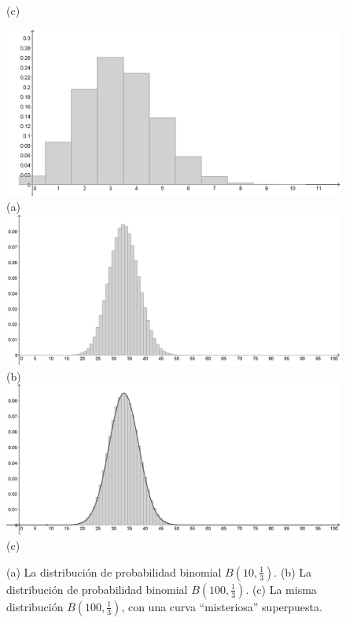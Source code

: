 \begin{figure}[p]
\begin{center}
\begin{enColor}
(c)
\end{enColor}
\begin{bn}
\includegraphics[width=12cm]{../fig/Cap05-HistogramaBinomial01-bn.png}\\
(a)\\
\includegraphics[width=12cm]{../fig/Cap05-HistogramaBinomial02-bn.png}\\
(b)\\
\includegraphics[width=12cm]{../fig/Cap05-HistogramaBinomial03-bn.png}\\
(c)
\end{bn}
\caption{(a) La distribución de probabilidad binomial $B\left(10,\frac{1}{3}\right)$. (b) La distribución de probabilidad binomial $B\left(100,\frac{1}{3}\right)$. (c) La misma distribución $B\left(100,\frac{1}{3}\right)$, con una curva ``misteriosa'' superpuesta.}
\label{cap05:fig:HistogramaBinomial02}
\end{center}
\end{figure}

